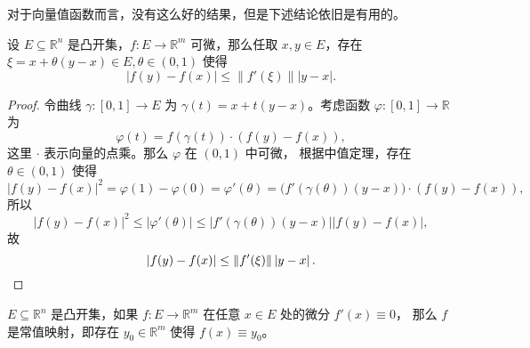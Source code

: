 \documentclass[fontset=none,zihao=-4]{Notes}
\newcommand{\norm}[1]{\left\lVert#1\right\rVert}
\newcommand{\abs}[1]{\left\lvert#1\right\rvert}
\begin{document}
对于向量值函数而言，没有这么好的结果，但是下述结论依旧是有用的。

\begin{theorem}[拟微分中值定理]\label{thm:mean-value 2}
  设 $E\subseteq\mathbb{R}^n$ 是凸开集，$f:E\to\mathbb{R}^m$ 可微，那么任取
  $x,y\in E$，存在 $\xi=x+\theta(y-x)\in E,\theta\in(0,1)$ 使得
  \[
    \abs{f(y)-f(x)}\leq\norm{f'(\xi)} \abs{y-x}. 
  \]
\end{theorem}
\begin{proof}
  令曲线 $\gamma:[0,1]\to E$ 为 $\gamma(t)=x+t(y-x)$。考虑函数
  $\varphi:[0,1]\to\mathbb{R}$ 为
  \[
    \varphi(t)=f(\gamma(t))\cdot (f(y)-f(x))  ,
  \]
  这里 $\cdot$ 表示向量的点乘。那么 $\varphi$ 在 $(0,1)$ 中可微，
  根据中值定理，存在 $\theta\in(0,1)$ 使得
  \[
    \abs{f(y)-f(x)}^2=\varphi(1)-\varphi(0)=\varphi'(\theta)=
    \bigl(f'(\gamma(\theta))(y-x)\bigr)\cdot (f(y)-f(x)), 
  \]
  所以
  \[
    \abs{f(y)-f(x)}^2\leq \abs{\varphi'(\theta)}\leq
    \abs{f'(\gamma(\theta))(y-x)}\abs{f(y)-f(x)},
  \]
  故
  \[
    \abs{f(y)-f(x)}\leq \norm{f'(\xi)}\abs{y-x}.\qedhere  
  \]
\end{proof}
\begin{corollary}\label{coro:constant}
  $E\subseteq\mathbb{R}^n$ 是凸开集，如果 $f:E\to\mathbb{R}^m$ 在任意 $x\in E$ 处的微分 $f'(x)\equiv 0$，
  那么 $f$ 是常值映射，即存在 $y_0\in\mathbb{R}^m$ 使得 $f(x)\equiv y_0$。
\end{corollary}
  
\end{document}
